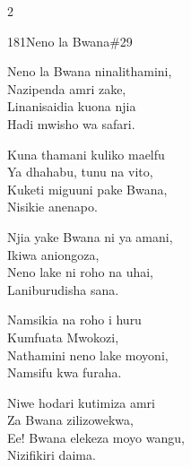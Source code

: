 \begin{multicols}{2}
\begin{hymn}{181}{Neno la Bwana}{\#29}
\begin{stanza}
Neno la Bwana ninalithamini,\\
Nazipenda amri zake,\\
Linanisaidia kuona njia\\
Hadi mwisho wa safari.
\end{stanza}
\begin{chorus}
Kuna thamani kuliko maelfu\\
Ya dhahabu, tunu na vito,\\
Kuketi miguuni pake Bwana,\\
Nisikie anenapo.
\end{chorus}
\begin{stanza}
Njia yake Bwana ni ya amani,\\
Ikiwa aniongoza,\\
Neno lake ni roho na uhai,\\
Laniburudisha sana.
\end{stanza}
\begin{stanza}
Namsikia na roho i huru\\
Kumfuata Mwokozi,\\
Nathamini neno lake moyoni,\\
Namsifu kwa furaha.
\end{stanza}
\begin{stanza}
Niwe hodari kutimiza amri\\
Za Bwana zilizowekwa,\\
Ee! Bwana elekeza moyo wangu,\\
Nizifikiri daima.
\end{stanza}
\end{hymn}


\end{multicols}
